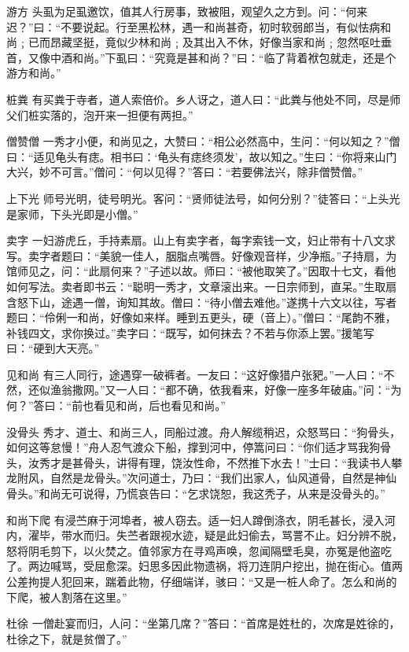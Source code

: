 \documentclass[12pt,UTF8]{ctexbook}
\begin{document}
游方
头虱为足虱邀饮，值其人行房事，致被阻，观望久之方到。问：“何来迟？”曰：“不要说起。行至黑松林，遇一和尚甚奇，初时软弱郎当，有似怯病和尚﹔已而昂藏坚挺，竟似少林和尚﹔及其出入不休，好像当家和尚﹔忽然呕吐垂首，又像中酒和尚。”下虱曰：“究竟是甚和尚？”曰：“临了背着袱包就走，还是个游方和尚。”

桩粪
有买粪于寺者，道人索倍价。乡人讶之，道人曰：“此粪与他处不同，尽是师父们桩实落的，泡开来一担便有两担。”

僧赞僧
一秀才小便，和尚见之，大赞曰：“相公必然高中，生问：“何以知之？”僧曰：“适见龟头有痣。相书曰：‘龟头有痣终须发’，故以知之。”生曰：“你将来山门大兴，妙不可言。”僧问：“何以见得？”答曰：“若要佛法兴，除非僧赞僧。”

上下光
师号光明，徒号明光。客问：“贤师徒法号，如何分别？”徒答曰：“上头光是家师，下头光即是小僧。”

卖字
一妇游虎丘，手持素扇。山上有卖字者，每字索钱一文，妇止带有十八文求写。卖字者题曰：“美貌一佳人，胭脂点嘴唇。好像观音样，少净瓶。”子持扇，为馆师见之，问：“此扇何来？”子述以故。师曰：“被他取笑了。”因取十七文，看他如何写法。卖者即书云：“聪明一秀才，文章滚出来。一日宗师到，直呆。”生取扇含怒下山，途遇一僧，询知其故。僧曰：“待小僧去难他。”遂携十六文以往，写者题曰：“伶俐一和尚，好像如来样。睡到五更头，硬（音上）。”僧曰：“尾韵不雅，补钱四文，求你换过。”卖字曰：“既写，如何抹去？不若与你添上罢。”援笔写曰：“硬到大天亮。”

见和尚
有三人同行，途遇穿一破裤者。一友曰：“这好像猎户张豝。”一人曰：“不然，还似渔翁撒网。”又一人曰：“都不确，依我看来，好像一座多年破庙。”问：“为何？”答曰：“前也看见和尚，后也看见和尚。”

没骨头
秀才、道士、和尚三人，同船过渡。舟人解缆稍迟，众怒骂曰：“狗骨头，如何这等怠慢！”舟人忍气渡众下船，撑到河中，停篙问曰：“你们适才骂我狗骨头，汝秀才是甚骨头，讲得有理，饶汝性命，不然推下水去！”士曰：“我读书人攀龙附风，自然是龙骨头。”次问道士，乃曰：“我们出家人，仙风道骨，自然是神仙骨头。”和尚无可说得，乃慌哀告曰：“乞求饶恕，我这秃子，从来是没骨头的。”

和尚下爬
有浸苎麻于河埠者，被人窃去。适一妇人蹲倒涤衣，阴毛甚长，浸入河内，濯毕，带水而归。失苎者跟视水迹，疑是此妇偷去，骂詈不止。妇分辨不脱，怒将阴毛剪下，以火焚之。值邻家方在寻鸡声唤，忽闻隔壁毛臭，亦冤是他盗吃了。两边喊骂，受屈愈深。妇思多因此物遗祸，将刀连阴户挖出，抛在街心。值两公差拘提人犯回来，踹着此物，仔细端详，骇曰：“又是一桩人命了。怎么和尚的下爬，被人割落在这里。”

杜徐
一僧赴宴而归，人问：“坐第几席？”答曰：“首席是姓杜的，次席是姓徐的，杜徐之下，就是贫僧了。”
\end{document}
